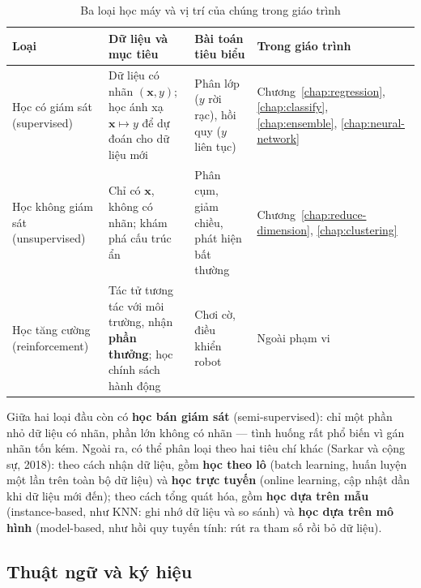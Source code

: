 \begin{table}[H]
\centering
\begin{tabular}{|p{2.8cm}|p{4.4cm}|p{3.4cm}|p{2.9cm}|}
\hline
\textbf{Loại} & \textbf{Dữ liệu và mục tiêu} & \textbf{Bài toán tiêu biểu} & \textbf{Trong giáo trình} \\
\hline
Học có giám sát (supervised) & Dữ liệu có nhãn $(\mathbf{x}, y)$; học ánh xạ $\mathbf{x} \mapsto y$ để dự đoán cho dữ liệu mới & Phân lớp ($y$ rời rạc), hồi quy ($y$ liên tục) & Chương~\ref{chap:regression}, \ref{chap:classify}, \ref{chap:ensemble}, \ref{chap:neural-network} \\ \hline
Học không giám sát (unsupervised) & Chỉ có $\mathbf{x}$, không có nhãn; khám phá cấu trúc ẩn & Phân cụm, giảm chiều, phát hiện bất thường & Chương~\ref{chap:reduce-dimension}, \ref{chap:clustering} \\ \hline
Học tăng cường (reinforcement) & Tác tử tương tác với môi trường, nhận \textbf{phần thưởng}; học chính sách hành động & Chơi cờ, điều khiển robot & Ngoài phạm vi \\ \hline
\end{tabular}
\caption{Ba loại học máy và vị trí của chúng trong giáo trình}
\label{tab:ml-types}
\end{table}

Giữa hai loại đầu còn có \textbf{học bán giám sát} (semi-supervised): chỉ một phần nhỏ dữ liệu có nhãn, phần lớn không có nhãn --- tình huống rất phổ biến vì gán nhãn tốn kém. Ngoài ra, có thể phân loại theo hai tiêu chí khác (Sarkar và cộng sự, 2018): theo cách nhận dữ liệu, gồm \textbf{học theo lô} (batch learning, huấn luyện một lần trên toàn bộ dữ liệu) và \textbf{học trực tuyến} (online learning, cập nhật dần khi dữ liệu mới đến); theo cách tổng quát hóa, gồm \textbf{học dựa trên mẫu} (instance-based, như KNN: ghi nhớ dữ liệu và so sánh) và \textbf{học dựa trên mô hình} (model-based, như hồi quy tuyến tính: rút ra tham số rồi bỏ dữ liệu).

\subsection{Thuật ngữ và ký hiệu}

